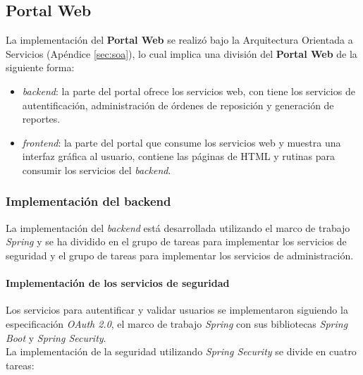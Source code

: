 \subsection{Portal Web}\label{sec:web-portal}
La implementación del \textbf{Portal Web} se realizó bajo la Arquitectura Orientada a Servicios (Apéndice \ref{sec:soa}), lo cual implica una división del \textbf{Portal Web} de la siguiente forma:
\begin{itemize}
	\item \textit{backend}: la parte del portal ofrece los servicios web, con tiene los servicios de autentificación, administración de órdenes de reposición y generación de reportes.
	\item \textit{frontend}: la parte del portal que consume los servicios web y muestra una interfaz gráfica al usuario, contiene las páginas de HTML y rutinas para consumir los servicios del \textit{backend}.
\end{itemize}

\subsubsection{Implementación del backend}\label{sec:backend}
La implementación del \textit{backend} está desarrollada utilizando el marco de trabajo \textit{Spring} y se ha dividido en el grupo de tareas para implementar los servicios de seguridad y el grupo de tareas para implementar los servicios de administración.

\paragraph{Implementación de los servicios de seguridad\\}
Los servicios para autentificar y validar usuarios se implementaron siguiendo la especificación \textit{OAuth 2.0}, el marco de trabajo \textit{Spring} con sus bibliotecas \textit{Spring Boot} y \textit{Spring Security}.\\
La implementación de la seguridad utilizando \textit{Spring Security} se divide en cuatro tareas:

